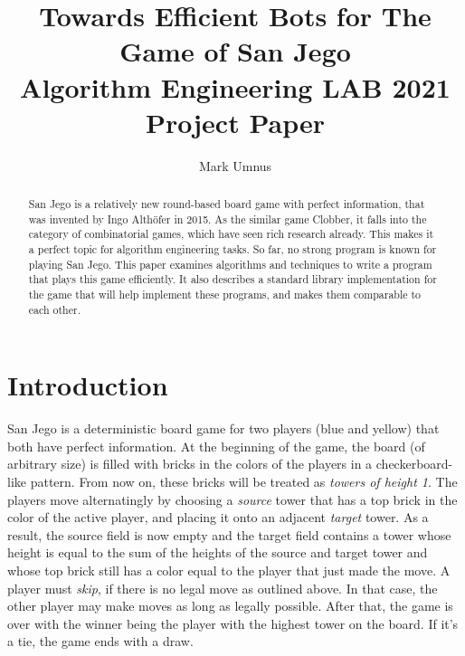 \documentclass[sigconf]{acmart}
\begin{document}
\title[San Jego]{Towards Efficient Bots for The Game of San Jego\\\large Algorithm Engineering LAB 2021 Project Paper}

\author{Mark Umnus}

\begin{abstract}

San Jego is a relatively new round-based board game with perfect information, that was invented by Ingo Althöfer in 2015.
As the similar game Clobber, it falls into the category of combinatorial games, which have seen rich research already.
This makes it a perfect topic for algorithm engineering tasks.
So far, no strong program is known for playing San Jego.
This paper examines algorithms and techniques to write a program that plays this game efficiently.
It also describes a standard library implementation for the game that will help implement these programs, and makes them comparable to each other.


\end{abstract}


\maketitle

\let\thefootnote\relax{}


\section{Introduction}

San Jego is a deterministic board game for two players (blue and yellow) that both have perfect information.
At the beginning of the game, the board (of arbitrary size) is filled with bricks in the colors of the players in a checkerboard-like pattern.
From now on, these bricks will be treated as \emph{towers of height 1}.
The players move alternatingly by choosing a \emph{source} tower that has a top brick in the color of the active player, and placing it onto an adjacent \emph{target} tower.
As a result, the source field is now empty and the target field contains a tower whose height is equal to the sum of the heights of the source and target tower and whose top brick still has a color equal to the player that just made the move.
A player must \emph{skip}, if there is no legal move as outlined above.
In that case, the other player may make moves as long as legally possible.
After that, the game is over with the winner being the player with the highest tower on the board.
If it's a tie, the game ends with a draw.
\end{document}
